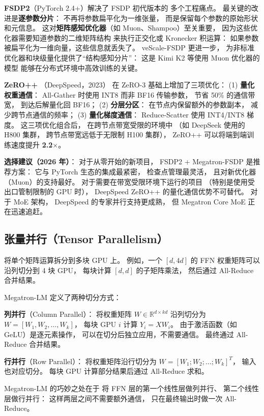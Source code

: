 \textbf{FSDP2}（PyTorch 2.4+）解决了 FSDP 初代版本的
多个工程痛点。
最关键的改进是\textbf{逐参数分片}：
不再将参数扁平化为一维张量，
而是保留每个参数的原始形状和元信息。
这对\textbf{矩阵感知优化器}（如 Muon、Shampoo）至关重要，
因为这些优化器需要知道参数的二维矩阵结构
来执行正交化或 Kronecker 积运算：
如果参数被扁平化为一维向量，这些信息就丢失了。
veScale-FSDP 更进一步，
为非标准优化器和块级量化提供了“结构感知分片”：
这是 Kimi K2 等使用 Muon 优化器的模型
能够在分布式环境中高效训练的关键。

\textbf{ZeRO++ }（DeepSpeed，2023）
在 ZeRO-3 基础上增加了三项优化：
(1) \textbf{量化权重通信}：
All-Gather 时使用 INT8 而非 BF16 传输参数，
节省 50\% 的通信带宽，
到达后解量化回 BF16；
(2) \textbf{分层分区}：
在节点内保留额外的参数副本，
减少跨节点通信的频率；
(3) \textbf{量化梯度通信}：
Reduce-Scatter 使用 INT4/INT8 梯度。
这三项优化组合后，
在跨节点带宽受限的环境中
（如 DeepSeek 使用的 H800 集群，
跨节点带宽远低于无限制 H100 集群），
ZeRO++ 可以将端到端训练速度提升 \textbf{2.2$\times$}。

\textbf{选择建议（2026 年）}：
对于从零开始的新项目，
FSDP2 + Megatron-FSDP 是推荐方案：
它与 PyTorch 生态的集成最紧密，
检查点管理最灵活，
且对新优化器（Muon）的支持最好。
对于需要在带宽受限环境下运行的项目
（特别是使用受出口管制限制的 GPU 时），
DeepSpeed ZeRO++ 的量化通信优势不可替代。
对于 MoE 架构，
DeepSpeed 的专家并行支持更成熟，
但 Megatron Core MoE 正在迅速追赶。

\subsection{张量并行（Tensor Parallelism）}

将单个矩阵运算拆分到多块 GPU 上。
例如，一个 $[d, 4d]$ 的 FFN 权重矩阵可以沿列切分到 4 块 GPU，
每块计算 $[d, d]$ 的子矩阵乘法，
然后通过 All-Reduce 合并结果。

Megatron-LM 定义了两种切分方式：

\textbf{列并行}（Column Parallel）：
将权重矩阵 $W \in \mathbb{R}^{d \times kd}$ 沿列切分为
$W = [W_1, W_2, \ldots, W_k]$，
每块 GPU $i$ 计算 $Y_i = XW_i$。
由于激活函数（如 GeLU）是逐元素操作，
可以在切分后独立应用，不需要通信。
最终通过 All-Reduce 合并结果。

\textbf{行并行}（Row Parallel）：
将权重矩阵沿行切分为 $W = [W_1; W_2; \ldots; W_k]^T$，
输入也对应切分。
每块 GPU 计算部分结果后通过 All-Reduce 求和。

Megatron-LM 的巧妙之处在于
将 FFN 层的第一个线性层做列并行、
第二个线性层做行并行：
这样两层之间不需要额外通信，
只在最终输出时做一次 All-Reduce。

